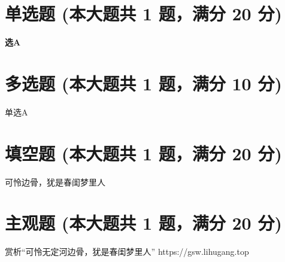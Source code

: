 \documentclass[12pt, a4paper, addpoints]{exam}
\begin{document}
\pagestyle{headandfoot}

\begin{center}
\end{center}
\vspace{5mm}

\normalsize
\vspace{5mm}

\section{\normalsize{单选题 (本大题共 1 题，满分 20 分)}}
\hspace{1.5cm}

\begin{questions}
\question[20] \textbf{选A}

\begin{oneparchoices}
\end{oneparchoices}

\end{questions}

\hspace{5cm}

\section{\normalsize{多选题 (本大题共 1 题，满分 10 分)}}
\hspace{1.5cm}
\begin{multicols}{2}
\begin{questions}
\question[10] 单选A

\begin{checkboxes}
\end{checkboxes}

\end{questions}
\end{multicols}

\hspace{5cm}

\section{\normalsize{填空题 (本大题共 1 题，满分 20 分)}}
\hspace{1.5cm}

\begin{questions}
\question[20] 可怜\uline{\qquad\qquad\qquad}边骨，犹是春闺梦里人

\end{questions}

\hspace{5cm}

\section{\normalsize{主观题 (本大题共 1 题，满分 20 分)}}
\hspace{1.5cm}

\begin{questions}
\question[20] 赏析“可怜无定河边骨，犹是春闺梦里人”
https://gsw.lihugang.top


\end{questions}
\end{document}

